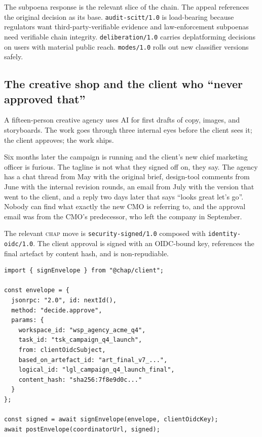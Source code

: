 \documentclass[11pt]{article}
\newcommand{\chap}{\textsc{chap}}
\begin{document}
The subpoena response is the relevant slice of the chain. The appeal references the original decision as its base. \texttt{audit-scitt/1.0} is load-bearing because regulators want third-party-verifiable evidence and law-enforcement subpoenas need verifiable chain integrity. \texttt{deliberation/1.0} carries deplatforming decisions on users with material public reach. \texttt{modes/1.0} rolls out new classifier versions safely.

\subsection{The creative shop and the client who ``never approved that''}

A fifteen-person creative agency uses AI for first drafts of copy, images, and storyboards. The work goes through three internal eyes before the client sees it; the client approves; the work ships.

Six months later the campaign is running and the client's new chief marketing officer is furious. The tagline is not what they signed off on, they say. The agency has a chat thread from May with the original brief, design-tool comments from June with the internal revision rounds, an email from July with the version that went to the client, and a reply two days later that says ``looks great let's go''. Nobody can find what exactly the new CMO is referring to, and the approval email was from the CMO's predecessor, who left the company in September.

The relevant \chap{} move is \texttt{security-signed/1.0} composed with \texttt{identity-oidc/1.0}. The client approval is signed with an OIDC-bound key, references the final artefact by content hash, and is non-repudiable.

\begin{lstlisting}[caption={Client-side signing flow.},label={lst:case8-sign}]
import { signEnvelope } from "@chap/client";

const envelope = {
  jsonrpc: "2.0", id: nextId(),
  method: "decide.approve",
  params: {
    workspace_id: "wsp_agency_acme_q4",
    task_id: "tsk_campaign_q4_launch",
    from: clientOidcSubject,
    based_on_artefact_id: "art_final_v7_...",
    logical_id: "lgl_campaign_q4_launch_final",
    content_hash: "sha256:7f8e9d0c..."
  }
};

const signed = await signEnvelope(envelope, clientOidcKey);
await postEnvelope(coordinatorUrl, signed);
\end{lstlisting}
\end{document}
